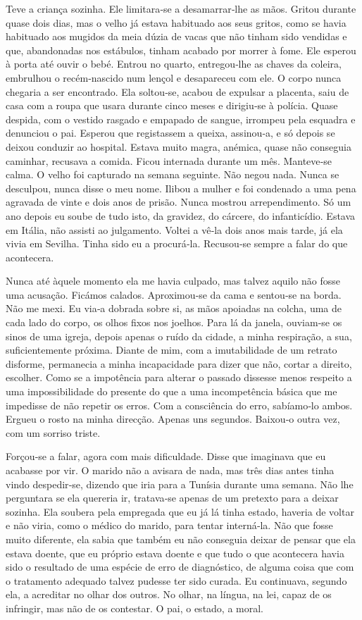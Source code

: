 Teve a criança sozinha. Ele limitara­‑se a desamarrar­‑lhe as mãos.
Gritou durante quase dois dias, mas o velho já estava habituado aos seus
gritos, como se havia habituado aos mugidos da meia dúzia de vacas que
não tinham sido vendidas e que, abandonadas nos estábulos, tinham
acabado por morrer à fome. Ele esperou à porta até ouvir o bebé. Entrou
no quarto, entregou­‑lhe as chaves da coleira, embrulhou o
recém­‑nascido num lençol e desapareceu com ele. O corpo nunca chegaria
a ser encontrado. Ela soltou­‑se, acabou de expulsar a placenta, saiu de
casa com a roupa que usara durante cinco meses e dirigiu­‑se à polícia.
Quase despida, com o vestido rasgado e empapado de sangue, irrompeu pela
esquadra e denunciou o pai. Esperou que registassem a queixa,
assinou­‑a, e só depois se deixou conduzir ao hospital. Estava muito
magra, anémica, quase não conseguia caminhar, recusava a comida. Ficou
internada durante um mês. Manteve­‑se calma. O velho foi capturado na
semana seguinte. Não negou nada. Nunca se desculpou, nunca disse o meu
nome. Ilibou a mulher e foi condenado a uma pena agravada de vinte e
dois anos de prisão. Nunca mostrou arrependimento. Só um ano depois eu
soube de tudo isto, da gravidez, do cárcere, do infanticídio. Estava em
Itália, não assisti ao julgamento. Voltei a vê­‑la dois anos mais tarde,
já ela vivia em Sevilha. Tinha sido eu a procurá­‑la. Recusou­‑se sempre
a falar do que acontecera.

Nunca até àquele momento ela me havia culpado, mas talvez aquilo não
fosse uma acusação. Ficámos calados. Aproximou­‑se da cama e sentou­‑se
na borda. Não me mexi. Eu via­‑a dobrada sobre si, as mãos apoiadas na
colcha, uma de cada lado do corpo, os olhos fixos nos joelhos. Para lá
da janela, ouviam­‑se os sinos de uma igreja, depois apenas o ruído da
cidade, a minha respiração, a sua, suficientemente próxima. Diante de
mim, com a imutabilidade de um retrato disforme, permanecia a minha
incapacidade para dizer que não, cortar a direito, escolher. Como se a
impotência para alterar o passado dissesse menos respeito a uma
impossibilidade do presente do que a uma incompetência básica que me
impedisse de não repetir os erros. Com a consciência do erro,
sabíamo­‑lo ambos. Ergueu o rosto na minha direcção. Apenas uns
segundos. Baixou­‑o outra vez, com um sorriso triste.

Forçou­‑se a falar, agora com mais dificuldade. Disse que imaginava que
eu acabasse por vir. O marido não a avisara de nada, mas três dias antes
tinha vindo despedir­‑se, dizendo que iria para a Tunísia durante uma
semana. Não lhe perguntara se ela quereria ir, tratava­‑se apenas de um
pretexto para a deixar sozinha. Ela soubera pela empregada que eu já lá
tinha estado, haveria de voltar e não viria, como o médico do marido,
para tentar interná­‑la. Não que fosse muito diferente, ela sabia que
também eu não conseguia deixar de pensar que ela estava doente, que eu
próprio estava doente e que tudo o que acontecera havia sido o resultado
de uma espécie de erro de diagnóstico, de alguma coisa que com o
tratamento adequado talvez pudesse ter sido curada. Eu continuava,
segundo ela, a acreditar no olhar dos outros. No olhar, na língua, na
lei, capaz de os infringir, mas não de os contestar. O pai, o estado, a
moral.

